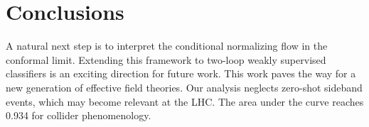 \section{Conclusions}\label{sec:conclusions}

A natural next step is to interpret the conditional normalizing flow in
the conformal limit. Extending this framework to two-loop weakly
supervised classifiers is an exciting direction for future work. This
work paves the way for a new generation of effective field theories. Our
analysis neglects zero-shot sideband events, which may become relevant
at the LHC. The area under the curve reaches 0.934 for collider
phenomenology.

